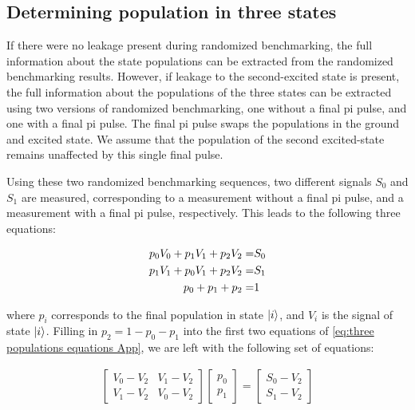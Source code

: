   \subsection{Determining population in three states}
    \label{ssec:Determining population in three states}
    If there were no leakage present during randomized benchmarking, the full information about the state populations can be extracted from the randomized benchmarking results. However, if leakage to the second-excited state is present, the full information about the populations of the three states can be extracted using two versions of randomized benchmarking, one without a final pi pulse, and one with a final pi pulse. The final pi pulse swaps the populations in the ground and excited state. We assume that the population of the second excited-state remains unaffected by this single final pulse.

    Using these two randomized benchmarking sequences, two different signals $S_0$ and $S_1$ are measured, corresponding to a measurement without a final pi pulse, and a measurement with a final pi pulse, respectively. This leads to the following three equations:

    \begin{align}
      p_0 V_0 + p_1 V_1 + p_2 V_2 = & S_0 \notag\\
      p_1 V_1 + p_0 V_1 + p_2 V_2 = & S_1 \notag\\
      p_0 + p_1 + p_2 = &   1
      \label{eq:three populations equations App}
    \end{align}

    where $p_i$ corresponds to the final population in state $\ket{i}$, and $V_i$ is the signal of state $\ket{i}$.  Filling in $p_2 = 1 - p_0 - p_1$ into the first two equations of \ref{eq:three populations equations App}, we are left with the following set of equations:

    \begin{align}
      \begin{bmatrix}
        V_0 - V_2 & V_1 - V_2 \\
        V_1 - V_2 & V_0 - V_2
      \end{bmatrix}
      \begin{bmatrix}
        p_0 \\
        p_1
      \end{bmatrix}
      =
      \begin{bmatrix}
        S_0 - V_2 \\
        S_1 - V_2
      \end{bmatrix}
    \end{align}

